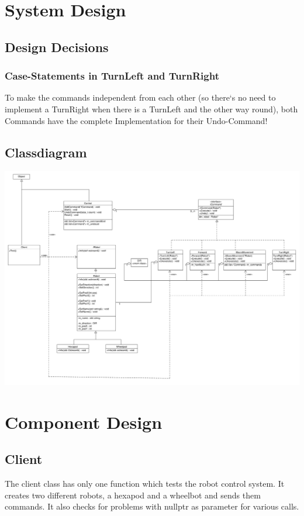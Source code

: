 \section{System Design}
\subsection{Design Decisions}
\subsubsection{Case-Statements in TurnLeft and TurnRight}
To make the commands independent from each other (so there`s no need to implement a TurnRight when there is a TurnLeft and the other way round), both Commands have the complete Implementation for their Undo-Command!

\newpage
\subsection{Classdiagram}
\includegraphics[scale=0.4, angle=90]{../ClassDiagram.pdf}

\section{Component Design}
\subsection{Client}
The client class has only one function which tests the robot control system. It creates two different robots, a hexapod and a wheelbot and sends them commands. It also checks for problems with nullptr as parameter for various calls.

